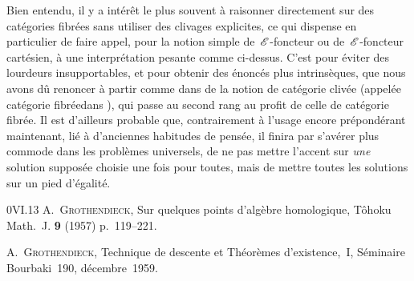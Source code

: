 \begin{remarquestar}
Bien entendu, il y a int\'er\^et le plus souvent \`a raisonner
directement sur des cat\'egories fibr\'ees sans utiliser des
clivages explicites, ce qui dispense en particulier de faire appel,
pour la notion simple de~$\cal{E}$-foncteur ou de~$\cal{E}$-foncteur
cart\'esien, \`a une interpr\'etation pesante comme
ci-dessus. C'est pour \'eviter des lourdeurs insupportables, et pour
obtenir des \'enonc\'es plus intrins\`eques,
que nous avons d\^u renoncer \`a partir comme dans \cite{VI.2} de la
notion de cat\'egorie cliv\'ee (appel\'ee \og cat\'egorie
fibr\'ee\fg dans \loccit), qui passe au second rang au profit de
celle de cat\'egorie fibr\'ee. Il est d'ailleurs probable que,
contrairement \`a l'usage encore pr\'epond\'erant maintenant,
li\'e \`a d'anciennes habitudes de pens\'ee, il finira par
s'av\'erer plus commode dans les probl\`emes universels, de ne pas
mettre l'accent sur \emph{une} solution suppos\'ee choisie une fois
pour toutes, mais de mettre toutes les solutions sur un pied
d'\'egalit\'e.
\end{remarquestar}

\begin{thebibliography}{0}{VI.13}
 A.\, \textsc{Grothendieck}, Sur quelques points d'alg\`ebre
homologique,
T\^ohoku Math.\ J. \textbf{9} (1957) p.\, 119--221.


 A.\, \textsc{Grothendieck}, Technique de descente et
Th\'eor\`emes d'existence,~I, S\'eminaire Bourbaki~190,
d\'ecembre~1959.
\end{thebibliography}



